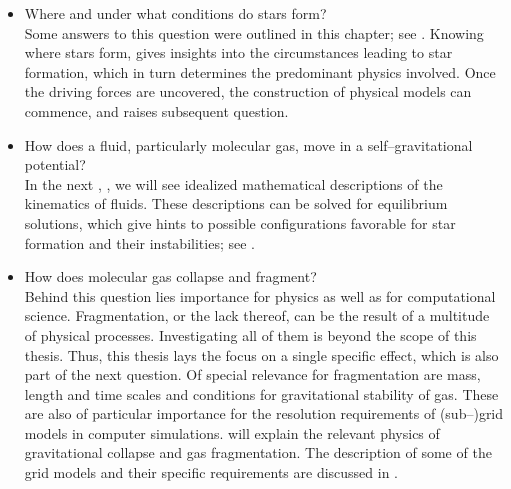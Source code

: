 \begin{itemize}
  \item Where and under what conditions do stars form? \\[3pt]
        Some answers to this question were outlined in this chapter; see .
        Knowing where stars form, gives insights into the circumstances leading to star formation, which in turn determines the predominant physics involved.
        Once the driving forces are uncovered, the construction of physical models can commence, and raises subsequent question.\\[-9pt]

  \item How does a fluid, particularly molecular gas, move in a self--gravitational potential? \\[3pt]
        In the next , , we will see idealized mathematical descriptions of the kinematics of fluids.
        These descriptions can be solved for equilibrium solutions, which give hints to possible configurations favorable for star formation and their instabilities; see . \\[-9pt]

  \item How does molecular gas collapse and fragment? \\[3pt]
        Behind this question lies importance for physics as well as for computational science.
        Fragmentation, or the lack thereof, can be the result of a multitude of physical processes.
        Investigating all of them is beyond the scope of this thesis.
        Thus, this thesis lays the focus on a single specific effect, which is also part of the next question.
        Of special relevance for fragmentation are mass, length and time scales and conditions for gravitational stability of gas.
        These are also of particular importance for the resolution requirements of (sub--)grid models in computer simulations.
         will explain the relevant physics of gravitational collapse and gas fragmentation.
        The description of some of the grid models and their specific requirements are discussed in . \\[-9pt]


\end{itemize}
